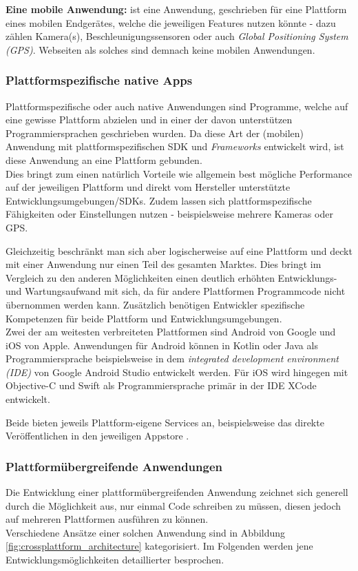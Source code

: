 \noindent
{}
\textbf{Eine mobile Anwendung:} ist eine Anwendung, geschrieben für eine Plattform eines mobilen Endgerätes, welche die jeweiligen Features nutzen könnte - dazu zählen Kamera(s), Beschleunigungssensoren oder auch \textit{Global Positioning System (GPS)}. Webseiten als solches sind demnach keine mobilen Anwendungen.


\subsubsection{Plattformspezifische native Apps}
Plattformspezifische oder auch native Anwendungen sind Programme, welche auf eine gewisse Plattform abzielen und in einer der davon unterstützen Programmiersprachen geschrieben wurden. Da diese Art der (mobilen) Anwendung mit plattformspezifischen  SDK und \textit{Frameworks} entwickelt wird, ist diese Anwendung an eine Plattform gebunden. \\
Dies bringt zum einen natürlich Vorteile wie allgemein best mögliche Performance auf der jeweiligen Plattform und direkt vom Hersteller unterstützte Entwicklungsumgebungen/SDKs.
Zudem lassen sich plattformspezifische Fähigkeiten oder Einstellungen nutzen - beispielsweise mehrere Kameras oder GPS.

\noindent
Gleichzeitig beschränkt man sich aber logischerweise auf eine Plattform und deckt mit einer Anwendung nur einen Teil des gesamten Marktes. Dies bringt im Vergleich zu den anderen Möglichkeiten einen deutlich erhöhten Entwicklungs- und Wartungsaufwand mit sich, da für andere Plattformen Programmcode nicht übernommen werden kann. Zusätzlich benötigen Entwickler spezifische Kompetenzen für beide Plattform und Entwicklungsumgebungen. \\

\noindent
Zwei der am weitesten verbreiteten Plattformen sind Android von Google und iOS von Apple. Anwendungen für Android können in Kotlin oder Java als Programmiersprache beispielsweise in dem \textit{integrated development environment (IDE)} von Google Android Studio entwickelt werden. Für iOS wird hingegen mit Objective-C und Swift als Programmiersprache primär in der IDE XCode entwickelt.

\noindent
Beide bieten jeweils Plattform-eigene Services an, beispielsweise das direkte Veröffentlichen in den jeweiligen Appstore \cite{fentaw2020}.

\subsubsection{Plattformübergreifende Anwendungen}
\label{plattformuebergreifende_anwendungen}
Die Entwicklung einer plattformübergreifenden Anwendung zeichnet sich generell durch die Möglichkeit aus, nur einmal Code schreiben zu müssen, diesen jedoch auf mehreren Plattformen ausführen zu können. \\
Verschiedene Ansätze einer solchen Anwendung sind in Abbildung \ref{fig:crossplattform_architecture} kategorisiert. Im Folgenden werden jene Entwicklungsmöglichkeiten detaillierter besprochen.

